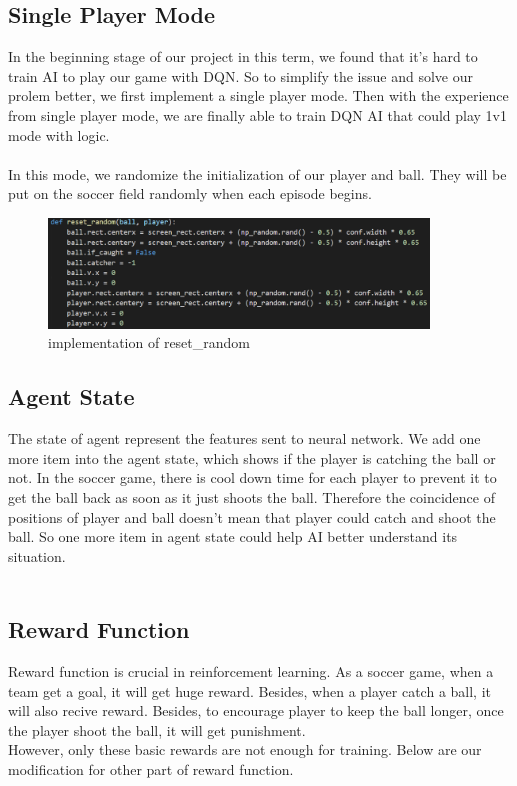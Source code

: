 \documentclass[12pt]{article}
\begin{document}
\subsection{Single Player Mode}
In the beginning stage of our project in this term, we found that it's hard to train AI to play our game with DQN. So to simplify the issue and solve our prolem better, we first implement a single player mode. Then with the experience from single player mode, we are finally able to train DQN AI that could play 1v1 mode with logic.\\\\
In this mode, we randomize the initialization of our player and ball. They will be put on the soccer field randomly when each episode begins.
\begin{figure}[H]
	\begin{center}
		\includegraphics[width=0.9\textwidth]{reset_random}
		\caption{implementation of reset\_random}
	\end{center}
\end{figure}


\subsection{Agent State}
The state of agent represent the features sent to neural network. We add one more item into the agent state, which shows if the player is catching the ball or not. In the soccer game, there is cool down time for each player to prevent it to get the ball back as soon as it just shoots the ball. Therefore the coincidence of positions of player and ball doesn't mean that player could catch and shoot the ball. So one more item in agent state could help AI better understand its situation.\\\\


\subsection{Reward Function}
Reward function is crucial in reinforcement learning. As a soccer game, when a team get a goal, it will get huge reward. Besides, when a player catch a ball, it will also recive reward. Besides, to encourage player to keep the ball longer, once the player shoot the ball, it will get punishment.\\
However, only these basic rewards are not enough for training. Below are our modification for other part of reward function.
\end{document}
